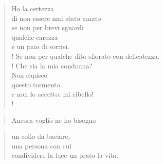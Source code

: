 
\begin{verse}
Ho la certezza\\
di non essere mai stato amato\\
se non per brevi sguardi\\
qualche carezza\\
e un paio di sorrisi.\\!
Se non per qualche dito sfiorato con delicatezza.\\!
Che sia la mia condanna?\\
Non capisco\\
questo tormento\\
e non lo accetto: mi ribello!\\!
\end{verse}

\begin{verse}Ancora voglio \hfill ne ho bisogno \end{verse}
\vspace{-0.9cm}
\begin{verse}
un collo da baciare,\\
una persona con cui\\
condividere la luce un prato la vita.\\
\end{verse}